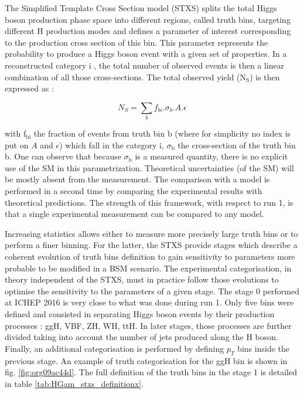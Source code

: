 \begin{enumerate}
The Simplified Template Cross Section \cite{arXiv_1605.04692} model (STXS) splits the total Higgs boson production phase space into different regions, called truth bins, targeting different H production modes and defines a parameter of interest corresponding to the production cross section of this bin.
This parameter represents the probability to produce a Higgs boson event with a given set of properties.
In a reconstructed category i , the total number of observed events is then a linear combination of all those cross-sections.
The total observed yield (N\(_{\text{S}}\)) is then expressed as :

\begin{equation}
N_S = \sum\limits_{b} f_{bi} .\sigma_{b} . A . \epsilon
\end{equation}

with f\(_{\text{bi}}\) the fraction of events from truth bin b (where for simplicity no index is put on $A$ and $\epsilon$) which fall in the category i, \(\sigma_{\text{b}}\) the cross-section of the truth bin b.
One can observe that because \(\sigma_{\text{b}}\) is a measured quantity, there is no explicit use of the SM in this parametrization.
Theoretical uncertainties (of the SM) will be mostly absent from the measurement.
The comparison with a model is performed in a second time by comparing the experimental results with theoretical predictions.
The strength of this framework, with respect to run 1, is that a single experimental measurement can be compared to any model.

Increasing statistics allows either to measure more precisely large truth bins or to perform a finer binning.
For the latter, the STXS provide stages which describe a coherent evolution of truth bins definition to gain sensitivity to parameters more probable to be modified in a BSM scenario.
The experimental categorisation, in theory independent of the STXS, must in practice follow those evolutions to optimise the sensitivity to the parameters of a given stage.
The stage 0 performed at ICHEP 2016 \cite{ATLAS-CONF-2016-081} is very close to what was done during run 1.
Only five bins were defined and consisted in separating Higgs boson events by their production processes : ggH, VBF, ZH, WH, ttH.
In later stages, those processes are further divided taking into account the number of jets produced along the H boson.
Finally, an additional categorisation is performed by defining $p_T$ bins inside the previous stage.
An example of truth categorisation for the ggH bin is shown in fig. \ref{fig:org09ac44d}.
The full definition of the truth bins in the stage 1 is detailed in table \ref{tab:HGam_stxs_definitionx}.


\end{enumerate}
